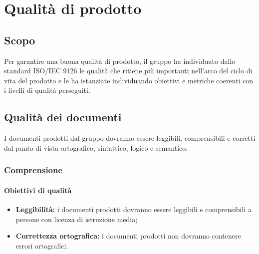 \documentclass[PianoDiQualifica.tex]{subfiles}
\begin{document}
\chapter{Qualità di prodotto}

\section{Scopo}
Per garantire una buona qualità di prodotto, il gruppo \gruppo ha individuato dallo standard ISO/IEC 9126 le qualità che ritiene più importanti nell’arco del ciclo di vita del prodotto e le ha istanziate individuando obiettivi e metriche coerenti con i livelli di qualità perseguiti.

\section{Qualità dei documenti}
I documenti prodotti dal gruppo \gruppo dovranno essere leggibili, comprensibili e corretti dal punto di vista ortografico, sintattico, logico e semantico.
\subsection{Comprensione}
\subsubsection{Obiettivi di qualità}
\begin{itemize}
	\item \textbf{Leggibilità:} i documenti prodotti dovranno essere leggibili e comprensibili a persone con licenza di istruzione media;
	\item \textbf{Correttezza ortografica:} i documenti prodotti non dovranno contenere errori ortografici.
\end{itemize}
\end{document}
